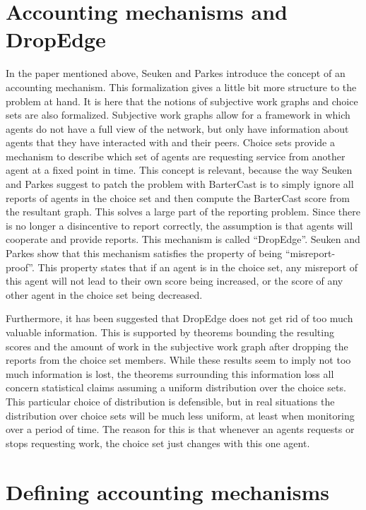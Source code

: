 \documentclass[a4paper,11pt]{book}
\theoremstyle{definition}
\begin{document}
\section{Accounting mechanisms and DropEdge}

In the paper mentioned above, Seuken and Parkes introduce the concept of an accounting mechanism. This formalization gives
a little bit more structure to the problem at hand. It is here that the notions of subjective work graphs
and choice sets are also formalized. Subjective work graphs allow for a framework in which agents
do not have a full view of the network, but only have information about agents that they have interacted
with and their peers. Choice sets provide a mechanism to describe which set of agents are requesting
service from another agent at a fixed point in time. 
This concept is relevant, because the way
Seuken and Parkes suggest to patch the problem with BarterCast is to simply ignore all reports of agents
in the choice set and then compute the BarterCast score from the resultant graph.
This solves a large part of the reporting problem. Since there is no longer a disincentive
to report correctly, the assumption is that agents will cooperate and provide reports.
This mechanism is called ``DropEdge''. Seuken and Parkes show that this mechanism satisfies the property
of being ``misreport-proof''. This property states that if an agent is in the choice set, 
any misreport of this agent will not lead to their own score being increased, or the score of
any other agent in the choice set being decreased.

Furthermore, it has been suggested that DropEdge does not get rid of too much valuable information.
This is supported by theorems bounding the resulting scores and the amount of work in the subjective
work graph after dropping the reports from the choice set members. While these results seem to imply
not too much information is lost, the theorems surrounding this information loss all concern statistical
claims assuming a uniform distribution over the choice sets. This particular choice of distribution is
defensible, but in real situations the distribution over choice sets will be much less uniform, at least
when monitoring over a period of time. The reason for this is that whenever an agents requests or
stops requesting work, the choice set just changes with this one agent.

\section{Defining accounting mechanisms}
\end{document}
